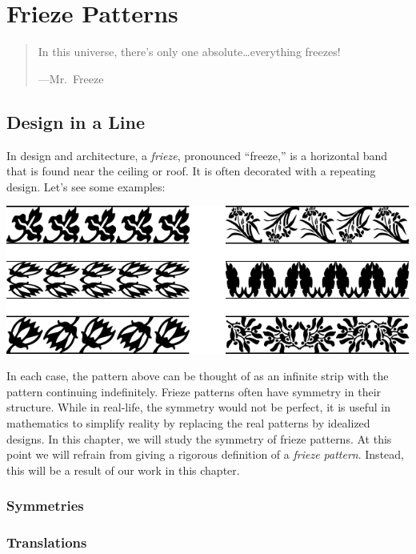\chapter{Frieze Patterns}

\begin{quote}
In this universe, there's only one absolute\dots everything freezes!

\hfill---Mr.\ Freeze
\end{quote}


\section{Design in a Line}

In design and architecture, a \textit{frieze},
pronounced ``freeze,'' is a horizontal band that is found near the
ceiling or roof. It is often decorated with a repeating design. Let's
see some examples:
\begin{center}
\includegraphics{../graphics/fpfrieze.pdf}
\end{center}
In each case, the pattern above can be thought of as an infinite strip
with the pattern continuing indefinitely.  Frieze patterns often have
symmetry in their structure. While in real-life, the symmetry would
not be perfect, it is useful in mathematics to simplify reality by
replacing the real patterns by idealized designs.  In this chapter, we
will study the symmetry of frieze patterns. At this point we will
refrain from giving a rigorous definition of a \textit{frieze
  pattern}. Instead, this will be a result of our work in this
chapter.


\break

\subsection{Symmetries}

\subsection*{Translations}

